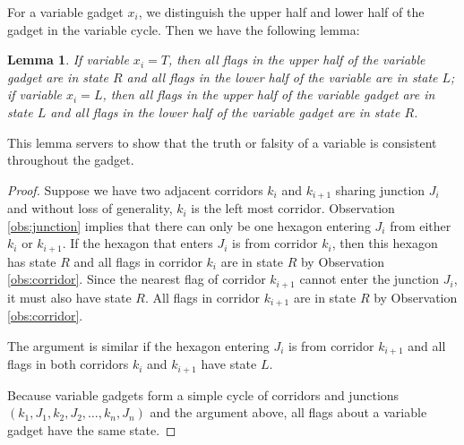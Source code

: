 \documentclass[10pt]{CSUNthesis}
\theoremstyle{plain}%
\newtheorem{lem}{Lemma}
\theoremstyle{definition}
\theoremstyle{remark}
\newcommand{\lr}[1]{\left( #1 \right)}
\begin{document}
For a variable gadget $x_i$, we distinguish the upper half and lower half of the gadget in the variable cycle.
Then we have the following lemma:
\begin{lem}\label{lem:aux-2}
If variable $x_i = T$, then all flags in the upper half of the variable gadget are in state $R$ and all flags in the lower half of the variable are in state $L$; if variable $x_i = L$, then all flags in the upper half of the variable gadget are in state $L$ and all flags in the lower half of the variable gadget are in state $R$.    
\end{lem}
This lemma servers to show that the truth or falsity of a variable is consistent throughout the gadget.
\begin{proof}
Suppose we have two adjacent corridors $k_i$ and $k_{i+1}$ sharing junction $J_i$ and without loss of generality, $k_i$ is the left most corridor.
Observation \ref{obs:junction} implies that there can only be one hexagon entering $J_i$ from either $k_i$ or $k_{i+1}$. If the hexagon that enters $J_i$ is from corridor $k_i$, then this hexagon has state $R$ and all flags in corridor $k_i$ are in state $R$ by Observation \ref{obs:corridor}. 
Since the nearest flag of corridor $k_{i+1}$ cannot enter the junction $J_i$, it must also have state $R$.  
All flags in corridor $k_{i+1}$ are in state $R$ by Observation \ref{obs:corridor}. 

The argument is similar if the hexagon entering $J_i$ is from corridor $k_{i+1}$ and all flags in both corridors $k_i$ and $k_{i+1}$ have state $L$.

Because variable gadgets form a simple cycle of corridors and junctions $\lr{k_1, J_1, k_2, J_2, \dots, k_n, J_n}$ and the argument above, all flags about a variable gadget have the same state.
\end{proof}
\end{document}
